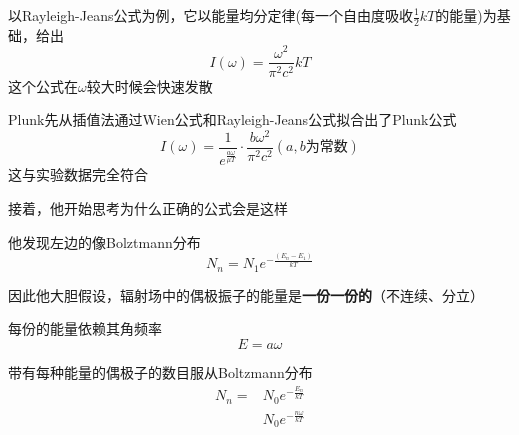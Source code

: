 \documentclass[lang=cn,10pt]{elegantbook}
\begin{document}
以Rayleigh-Jeans公式为例，它以能量均分定律(每一个自由度吸收$\frac{1}{2}kT$的能量)为基础，给出
\begin{equation}
	I\left( \omega \right) =\frac{\omega ^2}{\pi ^2c^2}kT
\end{equation}
这个公式在$\omega$较大时候会快速发散

Plunk先从插值法通过Wien公式和Rayleigh-Jeans公式拟合出了Plunk公式
\begin{equation}
	I\left( \omega \right) =\frac{1}{e^{\frac{a\omega}{\mu T}}}\cdot \frac{b\omega ^2}{\pi ^2c^2}\left( a,b\text{为常数} \right) 
\end{equation}
这与实验数据完全符合

接着，他开始思考为什么正确的公式会是这样

他发现左边的像Bolztmann分布
\begin{equation}
	N_n=N_1e^{-\frac{\left( E_n-E_1 \right)}{kT}}
\end{equation}

因此他大胆假设，辐射场中的偶极振子的能量是\textbf{一份一份的}（不连续、分立）

每份的能量依赖其角频率
\begin{equation}
	E=a\omega
\end{equation}

带有每种能量的偶极子的数目服从Boltzmann分布
\begin{equation}
	\begin{split}
		N_n=&N_0e^{-\frac{E_n}{kT}}\\
		&N_0e^{-\frac{n\omega}{kT}}
	\end{split}
\end{equation}
\end{document}
